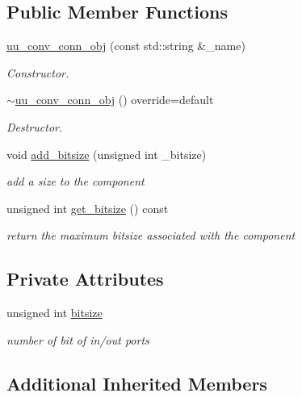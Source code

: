 \subsection*{Public Member Functions}
\begin{DoxyCompactItemize}
\item 
\hyperlink{classuu__conv__conn__obj_abc9f90423b06e36114d0d77a05945dc4}{uu\+\_\+conv\+\_\+conn\+\_\+obj} (const std\+::string \&\+\_\+name)
\begin{DoxyCompactList}\small\item\em Constructor. \end{DoxyCompactList}\item 
\hyperlink{classuu__conv__conn__obj_ae76c470f81fe09c19357f01bb4b894a3}{$\sim$uu\+\_\+conv\+\_\+conn\+\_\+obj} () override=default
\begin{DoxyCompactList}\small\item\em Destructor. \end{DoxyCompactList}\item 
void \hyperlink{classuu__conv__conn__obj_a2f9e62e2af2e3c497c8027e4bd128599}{add\+\_\+bitsize} (unsigned int \+\_\+bitsize)
\begin{DoxyCompactList}\small\item\em add a size to the component \end{DoxyCompactList}\item 
unsigned int \hyperlink{classuu__conv__conn__obj_a670323c83076fa3339e47686221635c8}{get\+\_\+bitsize} () const
\begin{DoxyCompactList}\small\item\em return the maximum bitsize associated with the component \end{DoxyCompactList}\end{DoxyCompactItemize}
\subsection*{Private Attributes}
\begin{DoxyCompactItemize}
\item 
unsigned int \hyperlink{classuu__conv__conn__obj_ae79020385840f1ad70fe513b6e69a113}{bitsize}
\begin{DoxyCompactList}\small\item\em number of bit of in/out ports \end{DoxyCompactList}\end{DoxyCompactItemize}
\subsection*{Additional Inherited Members}


